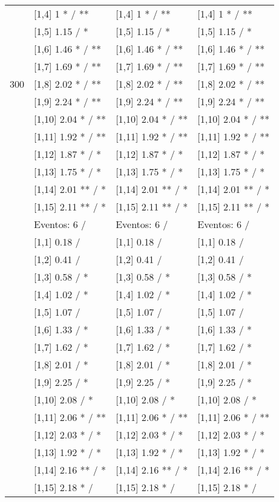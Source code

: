 \begin{table}
\begin{tabular}[t]{llll}
 & {}[1,4] 1 * / ** & {}[1,4] 1 * / ** & {}[1,4] 1 * / **\\
 & {}[1,5] 1.15  / * & {}[1,5] 1.15  / * & {}[1,5] 1.15  / *\\
 & {}[1,6] 1.46 * / ** & {}[1,6] 1.46 * / ** & {}[1,6] 1.46 * / **\\
 & {}[1,7] 1.69 * / ** & {}[1,7] 1.69 * / ** & {}[1,7] 1.69 * / **\\
300 & {}[1,8] 2.02 * / ** & {}[1,8] 2.02 * / ** & {}[1,8] 2.02 * / **\\
\addlinespace
 & {}[1,9] 2.24 * / ** & {}[1,9] 2.24 * / ** & {}[1,9] 2.24 * / **\\
 & {}[1,10] 2.04 * / ** & {}[1,10] 2.04 * / ** & {}[1,10] 2.04 * / **\\
 & {}[1,11] 1.92 * / ** & {}[1,11] 1.92 * / ** & {}[1,11] 1.92 * / **\\
 & {}[1,12] 1.87 * / * & {}[1,12] 1.87 * / * & {}[1,12] 1.87 * / *\\
 & {}[1,13] 1.75 * / * & {}[1,13] 1.75 * / * & {}[1,13] 1.75 * / *\\
\addlinespace
 & {}[1,14] 2.01 ** / * & {}[1,14] 2.01 ** / * & {}[1,14] 2.01 ** / *\\
 & {}[1,15] 2.11 ** / * & {}[1,15] 2.11 ** / * & {}[1,15] 2.11 ** / *\\
 & Eventos:  6 / & Eventos:  6 / & Eventos:  6 /\\
 & {}[1,1] 0.18  / & {}[1,1] 0.18  / & {}[1,1] 0.18  /\\
 & {}[1,2] 0.41  / & {}[1,2] 0.41  / & {}[1,2] 0.41  /\\
\addlinespace
 & {}[1,3] 0.58  / * & {}[1,3] 0.58  / * & {}[1,3] 0.58  / *\\
 & {}[1,4] 1.02  / * & {}[1,4] 1.02  / * & {}[1,4] 1.02  / *\\
 & {}[1,5] 1.07  / & {}[1,5] 1.07  / & {}[1,5] 1.07  /\\
 & {}[1,6] 1.33  / * & {}[1,6] 1.33  / * & {}[1,6] 1.33  / *\\
 & {}[1,7] 1.62  / * & {}[1,7] 1.62  / * & {}[1,7] 1.62  / *\\
\addlinespace
500 & {}[1,8] 2.01  / * & {}[1,8] 2.01  / * & {}[1,8] 2.01  / *\\
 & {}[1,9] 2.25  / * & {}[1,9] 2.25  / * & {}[1,9] 2.25  / *\\
 & {}[1,10] 2.08  / * & {}[1,10] 2.08  / * & {}[1,10] 2.08  / *\\
 & {}[1,11] 2.06 * / ** & {}[1,11] 2.06 * / ** & {}[1,11] 2.06 * / **\\
 & {}[1,12] 2.03 * / * & {}[1,12] 2.03 * / * & {}[1,12] 2.03 * / *\\
\addlinespace
 & {}[1,13] 1.92 * / * & {}[1,13] 1.92 * / * & {}[1,13] 1.92 * / *\\
 & {}[1,14] 2.16 ** / * & {}[1,14] 2.16 ** / * & {}[1,14] 2.16 ** / *\\
 & {}[1,15] 2.18 * / & {}[1,15] 2.18 * / & {}[1,15] 2.18 * /\\
\bottomrule
\end{tabular}
\end{table}
